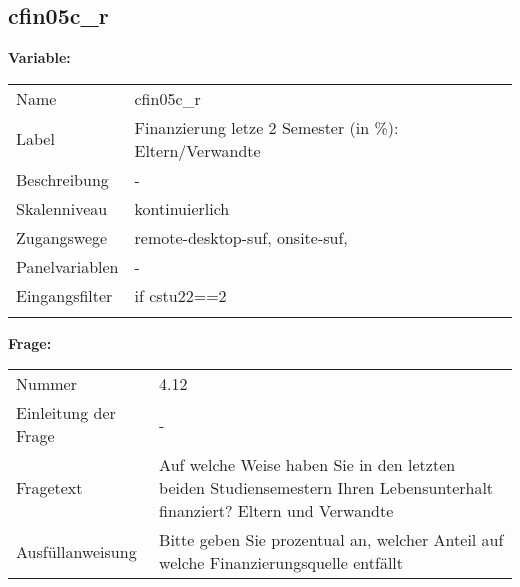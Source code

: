 	
	
	\subsection{cfin05c\_r}
	\label{subSection:cfin05c_r}

	\noindent\textbf{Variable:}\\
		\begin{tabular}{lL{11.3cm}}
			\label{tableVariable:cfin05c_r}
			Name & cfin05c\_r \\
			Label & Finanzierung letze 2 Semester (in \%): Eltern/Verwandte \\
			Beschreibung & - \\
			Skalenniveau & kontinuierlich \\
			Zugangswege &
				remote-desktop-suf,
				onsite-suf,
 \\
			Panelvariablen & -
			 \\
			Eingangsfilter & if cstu22==2 \\
 \\
		\end{tabular}

		\vspace*{1 cm}
		\noindent\textbf{Frage:}\\
		\begin{tabular}{lL{11.3cm}}
			\label{tableQuestion:cfin05c_r}
			Nummer & 4.12 \\
			Einleitung der Frage & - \\
			Fragetext & Auf welche Weise haben Sie in den letzten beiden Studiensemestern Ihren Lebensunterhalt finanziert?
Eltern und Verwandte \\
			Ausfüllanweisung & Bitte geben Sie prozentual an, welcher Anteil auf welche Finanzierungsquelle entfällt \\
		\end{tabular}




